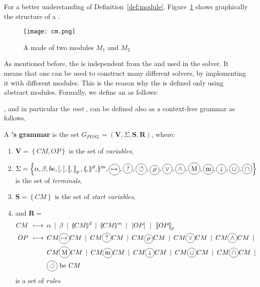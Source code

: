 For a better understanding of Definition~\ref{def:module}, Figure~\ref{fig:cm} shows graphically  the structure of a \cm.

\begin{figure}[h]
	\centering
	\texttt{[image: cm.png]}
	\caption[]{A \cm{} made of two modules $M_1$ and $M_2$}
	\label{fig:cm}
\end{figure}

As mentioned before, the \as{} is independent from the \oms{} and \opchs{} used in the solver. It means that one \as{} can be used to construct many different solvers, by implementing it with different modules. %
This is the reason why the \as{} is defined only using {abstract} modules. Formally, we define an \as{} as follows:


\Cms{}, and in particular the \textit{root} \cm{}, can be defined also as a context-free grammar as follows.

\begin{definition}\label{def:grammar} A {\bf \cm{}'s grammar} is the set $G_{POSL} = \left(\mathbf{V},\Sigma, \mathbf{S}, \mathbf{R}\right)$, where:
\begin{enumerate}\renewcommand{\labelitemi}{\scriptsize$\blacksquare$}
	\item $\mathbf{V} = \left\{CM, OP\right\}$ is the set of {\it variables},
	\item $\Sigma = \left\{\alpha, \beta, be, [, ], \lbk, \rbk_p, \lsendpar, \rsenddatapar, \rsendmodulepar, \circled{$\mapsto$},\circled{?},\cycop, \circled{$\rho$}, \circled{$\vee$}, \circled{$\wedge$}, \circled{M}, \circled{m}, \circled{$\shortdownarrow$}, \circled{$\cup$}, \circled{$\cap$}\right\}$ is the set of {\it terminals},
	\item $\mathbf{S} = \left\{CM\right\}$ is the set of {\it start variables},
	\item and $\mathbf{R} = $
		\begin{align*} 
		CM \produce & \alpha \OR \beta \OR \senddataop{CM} \OR \sendmoduleop{CM} \OR \left[OP\right] \OR \lbk OP\rbk_p\\
		OP \produce & CM \circled{$\mapsto$} CM \OR CM \circled{?} CM \OR CM \circled{$\rho$} CM \OR CM \circled{$\vee$} CM \OR CM \circled{$\wedge$} CM  \OR\\
		& CM \circled{M} CM \OR CM \circled{m} CM \OR CM \circled{$\shortdownarrow$} CM \OR CM \circled{$\cup$} CM \OR CM \circled{$\cap$} CM  \OR\\
		& \cycop \text{ be } CM%
		\end{align*} is a set of {\it rules}
\end{enumerate} 
\end{definition}

